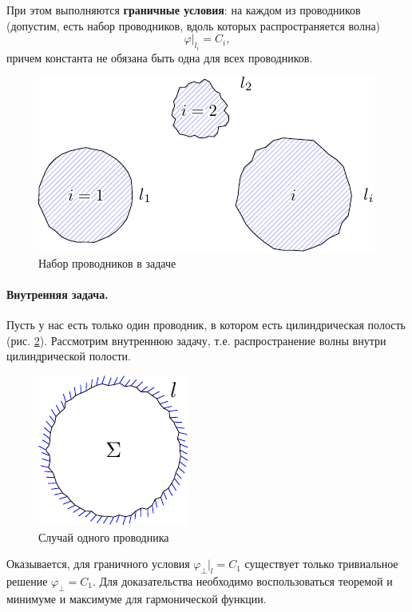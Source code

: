 При этом выполняются \textbf{граничные условия}: на каждом из проводников (допустим, есть набор проводников, вдоль которых распространяется волна)
\begin{equation*}
\varphi|_{l_i}=C_i,
\end{equation*}
причем константа не обязана быть одна для всех проводников.

\begin{figure}[H]
	\centering
	\includegraphics[scale=1]{img/lect4_ris1}
	\caption{Набор проводников в задаче}
	\label{fig:lect4:1}
\end{figure}

\paragraph{Внутренняя задача.} Пусть у нас есть только один проводник, в котором есть цилиндрическая полость (рис. \ref{fig:lect4:2}). Рассмотрим внутреннюю задачу, т.е. распространение волны внутри цилиндрической полости.  
\begin{figure}[H]
	\centering
	\includegraphics[scale=1]{img/lect4_ris2}
	\caption{Случай одного проводника}
	\label{fig:lect4:2}
\end{figure}
Оказывается, для граничного условия $\varphi_\perp|_l=C_1$ существует только тривиальное решение $\varphi_\perp=C_1$. Для доказательства необходимо воспользоваться теоремой и минимуме и максимуме для гармонической функции.

